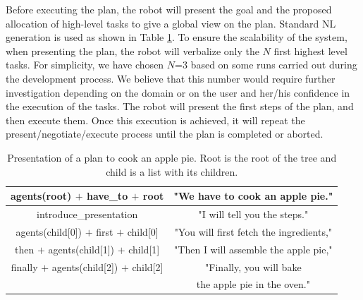 Before executing the plan, the robot will present the goal and the proposed allocation of high-level tasks to give a global view on the plan. Standard NL generation is used as shown in Table \ref{table:pie-present}. 
To ensure the scalability of the system, when presenting the plan, the robot will verbalize only the $N$ first highest level tasks. For simplicity, we have chosen $N$=$3$ based on some runs carried out during the development process. We believe that this number would require further investigation depending on the domain or on the user and her/his confidence in the execution of the tasks. The robot will present the first steps of the plan, and then execute them. Once this execution is achieved, it will repeat the present/negotiate/execute process until the plan is completed or aborted.



 
 
 \begin{table}
\centering
\scriptsize
\renewcommand{\arraystretch}{1.3}
\begin{tabular}{c|c}
   agents(root) $+$ have\_to $+$ root  & "We have to cook an apple pie." \\
   \hline
   introduce\_presentation & "I will tell you the steps." \\
   \hline
   agents(child[0]) $+$ first $+$ child[0] & "You will first fetch the ingredients," \\
   \hline
   then $+$ agents(child[1]) $+$  child[1] & "Then I will assemble the apple pie," \\
   \hline
   finally $+$ agents(child[2]) $+$  child[2] & "Finally, you will bake \\
   & the apple pie in the oven." \\
\end{tabular}
 \vspace{-4pt}
\caption{Presentation of a plan to cook an apple pie. Root is the root of the tree and child is a list with its children.}
 \vspace{-20pt}
 \label{table:pie-present}    
\end{table}
 
